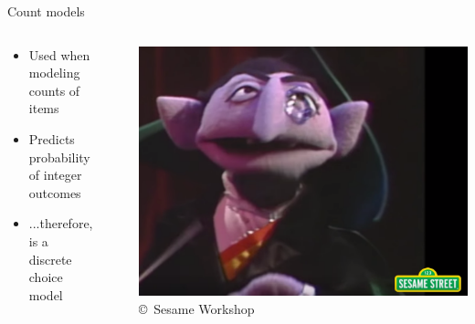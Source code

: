 \begin{frame}{Count models}
  \begin{columns}
    \begin{column}{0.65\textwidth}
      \begin{itemize}
        \item Used when modeling counts of items
        \item Predicts probability of integer outcomes
        \item ...therefore, is a discrete choice model
      \end{itemize}
    \end{column}~%
    \begin{column}{0.34\textwidth}
      \includegraphics[width=\textwidth]{img/countvoncount.png}\\
      {\tiny\hfill\copyright~Sesame Workshop}
    \end{column}
  \end{columns}
\end{frame}

